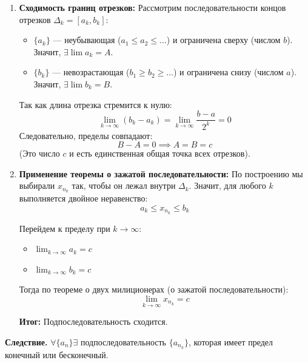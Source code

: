 \begin{tcolorbox}[title=Доказательство (через вложенные отрезки), breakable]
\begin{enumerate}
		\item \textbf{Сходимость границ отрезков:}
		Рассмотрим последовательности концов отрезков $\Delta_k = [a_k, b_k]$:
		\begin{itemize}
			\item $\{a_k\}$ — неубывающая ($a_1 \le a_2 \le \dots$) и ограничена сверху (числом $b$). Значит, $\exists \lim a_k = A$.
			\item $\{b_k\}$ — невозрастающая ($b_1 \ge b_2 \ge \dots$) и ограничена снизу (числом $a$). Значит, $\exists \lim b_k = B$.
		\end{itemize}
		Так как длина отрезка стремится к нулю:
		$$ \lim_{k\to\infty} (b_k - a_k) = \lim_{k\to\infty} \frac{b-a}{2^k} = 0 $$
		Следовательно, пределы совпадают:
		$$ B - A = 0 \implies A = B = c $$
		(Это число $c$ и есть единственная общая точка всех отрезков).

		\item \textbf{Применение теоремы о зажатой последовательности:}
		По построению мы выбирали $x_{n_k}$ так, чтобы он лежал внутри $\Delta_k$. Значит, для любого $k$ выполняется двойное неравенство:
		$$ a_k \le x_{n_k} \le b_k $$
		
		Перейдем к пределу при $k \to \infty$:
		\begin{itemize}
			\item $\lim_{k\to\infty} a_k = c$
			\item $\lim_{k\to\infty} b_k = c$
		\end{itemize}
		
		Тогда по теореме о двух милиционерах (о зажатой последовательности):
		$$ \lim_{k\to\infty} x_{n_k} = c $$
		
		\textbf{Итог:} Подпоследовательность сходится.
	\end{enumerate}
\end{tcolorbox}

\textbf{Следствие.} $\forall \{a_n\} \exists$ подпоследовательность $\{a_{n_k}\}$, которая имеет предел конечный или бесконечный. 

